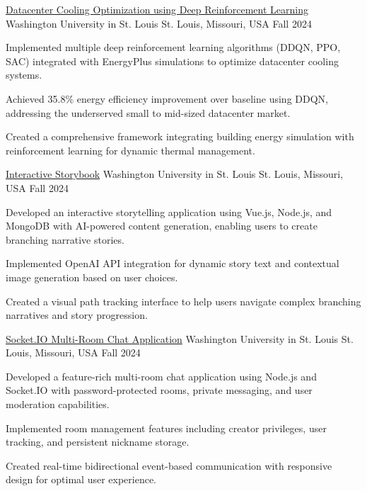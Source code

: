 \documentclass[10pt, letterpaper]{article}
\begin{document}
\begin{projectentry}
  {\href{https://github.com/agopalareddy/CSE510A_Datacenter_Cooling}{Datacenter Cooling Optimization using Deep Reinforcement Learning}} %
  {Washington University in St. Louis} %
  {St. Louis, Missouri, USA} %
  {Fall 2024} %
  \item Implemented multiple deep reinforcement learning algorithms (DDQN, PPO, SAC) integrated with EnergyPlus simulations to optimize datacenter cooling systems.
  \item Achieved 35.8\% energy efficiency improvement over baseline using DDQN, addressing the underserved small to mid-sized datacenter market.
  \item Created a comprehensive framework integrating building energy simulation with reinforcement learning for dynamic thermal management.
\end{projectentry}

\begin{projectentry}
  {\href{https://github.com/agopalareddy/CSE503S_Interactive_Storybook}{Interactive Storybook}} %
  {Washington University in St. Louis} %
  {St. Louis, Missouri, USA} %
  {Fall 2024} %
  \item Developed an interactive storytelling application using Vue.js, Node.js, and MongoDB with AI-powered content generation, enabling users to create branching narrative stories.
  \item Implemented OpenAI API integration for dynamic story text and contextual image generation based on user choices.
  \item Created a visual path tracking interface to help users navigate complex branching narratives and story progression.
\end{projectentry}

\begin{projectentry}
  {\href{https://github.com/agopalareddy/CSE503S_Chat_App}{Socket.IO Multi-Room Chat Application}} %
  {Washington University in St. Louis} %
  {St. Louis, Missouri, USA} %
  {Fall 2024} %
  \item Developed a feature-rich multi-room chat application using Node.js and Socket.IO with password-protected rooms, private messaging, and user moderation capabilities.
  \item Implemented room management features including creator privileges, user tracking, and persistent nickname storage.
  \item Created real-time bidirectional event-based communication with responsive design for optimal user experience.
\end{projectentry}
\end{document}
